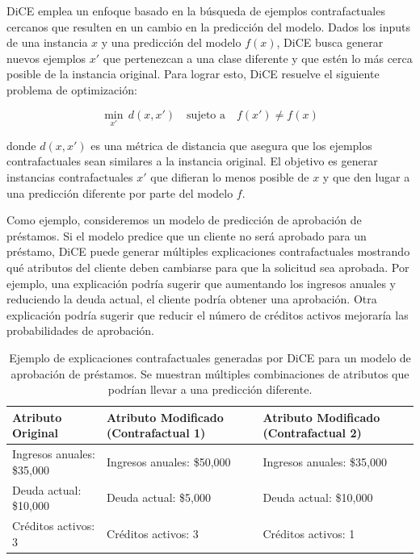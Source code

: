 DiCE emplea un enfoque basado en la búsqueda de ejemplos contrafactuales cercanos que resulten en un cambio en la predicción del modelo. Dados los inputs de una instancia $x$ y una predicción del modelo $f(x)$, DiCE busca generar nuevos ejemplos $x'$ que pertenezcan a una clase diferente y que estén lo más cerca posible de la instancia original. Para lograr esto, DiCE resuelve el siguiente problema de optimización:

\[
\min_{x'} \, d(x, x') \quad \text{sujeto a} \quad f(x') \neq f(x)
\]

donde $d(x, x')$ es una métrica de distancia que asegura que los ejemplos contrafactuales sean similares a la instancia original. El objetivo es generar instancias contrafactuales $x'$ que difieran lo menos posible de $x$ y que den lugar a una predicción diferente por parte del modelo $f$.

Como ejemplo, consideremos un modelo de predicción de aprobación de préstamos. Si el modelo predice que un cliente no será aprobado para un préstamo, DiCE puede generar múltiples explicaciones contrafactuales mostrando qué atributos del cliente deben cambiarse para que la solicitud sea aprobada. Por ejemplo, una explicación podría sugerir que aumentando los ingresos anuales y reduciendo la deuda actual, el cliente podría obtener una aprobación. Otra explicación podría sugerir que reducir el número de créditos activos mejoraría las probabilidades de aprobación.

\begin{table}[H]
    \centering
    \scriptsize
    \renewcommand{\arraystretch}{1.5}
    \begin{tabular}{p{4cm} p{4cm} p{4cm}}
        \toprule
        \textbf{Atributo Original} & \textbf{Atributo Modificado (Contrafactual 1)} & \textbf{Atributo Modificado (Contrafactual 2)} \\
        \midrule
        Ingresos anuales: \$35,000 & Ingresos anuales: \$50,000 & Ingresos anuales: \$35,000 \\
        Deuda actual: \$10,000 & Deuda actual: \$5,000 & Deuda actual: \$10,000 \\
        Créditos activos: 3 & Créditos activos: 3 & Créditos activos: 1 \\
        \bottomrule
    \end{tabular}
    \caption{Ejemplo de explicaciones contrafactuales generadas por DiCE para un modelo de aprobación de préstamos. Se muestran múltiples combinaciones de atributos que podrían llevar a una predicción diferente.}
    \label{tab:dice-example}
\end{table}

